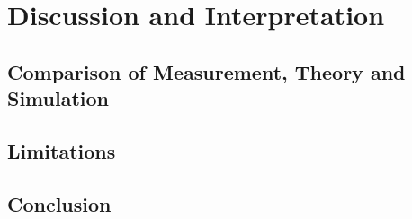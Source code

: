 \chapter{Discussion and Interpretation}\label{ch:discussion}

\section{Comparison of Measurement, Theory and Simulation}\label{sec:comparison}

\section{Limitations}\label{sec:limitations}

\section{Conclusion}\label{sec:conclusion}
